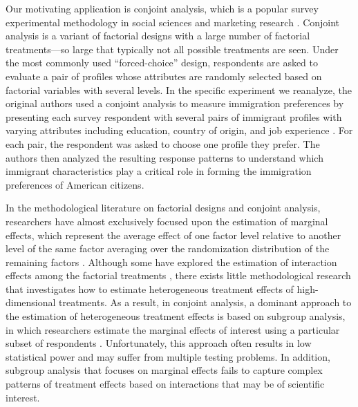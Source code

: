 \documentclass[11pt]{article}
\begin{document}
Our motivating application is conjoint analysis, which is a popular
survey experimental methodology in social sciences and marketing
research \citep[e.g.,][]{hainmueller2014causal,rao:14}.  Conjoint
analysis is a variant of factorial designs \citep{DasPilRub15} with a
large number of factorial treatments---so large that typically not all
possible treatments are seen.  Under the most commonly used
``forced-choice'' design, respondents are asked to evaluate a pair of
profiles whose attributes are randomly selected based on factorial
variables with several levels.  In the specific experiment we
reanalyze, the original authors used a conjoint analysis to measure
immigration preferences by presenting each survey respondent with
several pairs of immigrant profiles with varying attributes including
education, country of origin, and job experience
\citep{hainmueller2015hidden}.  For each pair, the respondent was
asked to choose one profile they prefer.  The authors then analyzed
the resulting response patterns to understand which immigrant
characteristics play a critical role in forming the immigration
preferences of American citizens.

In the methodological literature on factorial designs and conjoint
analysis, researchers have almost exclusively focused upon the
estimation of marginal effects, which represent the average effect of
one factor level relative to another level of the same factor
averaging over the randomization distribution of the remaining factors
\citep{hainmueller2014causal, DasPilRub15}.  Although some have
explored the estimation of interaction effects among the factorial
treatments
\citep[e.g.,][]{DasPilRub15,egam:imai:19,de2022improving}, there
exists little methodological research that investigates how to
estimate heterogeneous treatment effects of high-dimensional
treatments.  As a result, in conjoint analysis, a dominant approach to
the estimation of heterogeneous treatment effects is based on subgroup
analysis, in which researchers estimate the marginal effects of
interest using a particular subset of respondents
\citep[e.g.,][]{hainmueller2015hidden,newman2019economic}.
Unfortunately, this approach often results in low statistical power
and may suffer from multiple testing problems.  In addition, subgroup
analysis that focuses on marginal effects fails to capture complex
patterns of treatment effects based on interactions that may be of
scientific interest.
\end{document}
